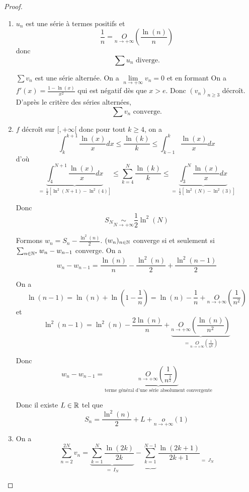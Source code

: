 \begin{proof}
	\phantom{}
	\begin{enumerate}
		\item $u_{n}$ est une série à termes positifs et 
		$$\frac{1}{n}=\underset{n\to+\infty}{O}\left(\frac{\ln(n)}{n}\right)$$
		donc 
		$$\boxed{\sum u_{n}\text{ diverge.}}$$

		$\sum v_{n}$ est une série alternée. On a $\lim\limits_{n\to+\infty}v_{n}=0$ et en formant \function{f}{[2,\infty[}{\R}{x}{\frac{\ln(x)}{x}}
		On a $f'(x)=\frac{1-\ln(x)}{x^{2}}$ qui est négatif dès que $x>e$. Donc $(v_{n})_{n\geqslant3}$ décroît. D'après le critère des séries alternées, 
		$$\boxed{\sum v_{n}\text{ converge.}}$$

		\item $f$ décroît sur $[,+\infty[$ donc pour tout $k\geqslant4$, on a 
		$$\int_{k}^{k+1}\frac{\ln(x)}{x}dx\leqslant\frac{\ln(k)}{k}\leqslant\int_{k-1}^{k}\frac{\ln(x)}{x}dx$$
		d'où 
		$$\underbrace{\int_{4}^{N+1}\frac{\ln(x)}{x}dx}_{=~\frac{1}{2}\left[\ln^{2}\left(N+1\right)-\ln^{2}\left(4\right)\right]}\leqslant\sum_{k=4}^{N}\frac{\ln(k)}{k}\leqslant\underbrace{\int_{3}^{N}\frac{\ln(x)}{x}dx}_{=~\frac{1}{2}\left[\ln^{2}\left(N\right)-\ln^{2}\left(3\right)\right]}$$

		Donc 
		$$\boxed{S_{N}\underset{N\to+\infty}{\sim}\frac{1}{2}\ln^{2}\left(N\right)}$$

		Formons $w_{n}=S_{n}-\frac{\ln^{2}(n)}{2}$. $(w_{n})_{n\in\mathbb{N}}$ converge si et seulement si $\sum_{n\in\mathbb{N}^{*}}w_{n}-w_{n-1}$ converge.
		On a 
		$$w_{n}-w_{n-1}=\frac{\ln(n)}{n}-\frac{\ln^{2}(n)}{2}+\frac{\ln^{2}(n-1)}{2}$$

		On a 
		$$\ln(n-1)=\ln(n)+\ln\left(1-\frac{1}{n}\right)=\ln(n)-\frac{1}{n}+\underset{n\to+\infty}{O}\left(\frac{1}{n^{2}}\right)$$
		et 
		$$\ln^{2}(n-1)=\ln^{2}(n)-\frac{2\ln(n)}{n}+\underbrace{\underset{n\to+\infty}{O}\left(\frac{\ln(n)}{n^{2}}\right)}_{=\underset{n\to+\infty}{O}\left(\frac{1}{n^{\frac{3}{2}}}\right)}$$

		Donc 
		$$w_{n}-w_{n-1}=\underbrace{\underset{n\to+\infty}{O}\left(\frac{1}{n^{\frac{3}{2}}}\right)}_{\text{terme général d'une série absolument convergente}}$$

		Donc il existe $L\in\mathbb{R}$ tel que 
		$$\boxed{S_{n}=\frac{\ln^{2}(n)}{2}+L+\underset{n\to+\infty}{o}(1)}$$
		
		\item On a 
		$$\sum_{n=2}^{2N}v_{n}=\underbrace{\sum_{k=1}^{N}\frac{\ln(2k)}{2k}}_{=~I_{N}}-\underbrace{\sum_{k=1}^{N-1}}\frac{\ln(2k+1)}{2k+1}_{=~J_{N}}$$


\end{enumerate}
\end{proof}

